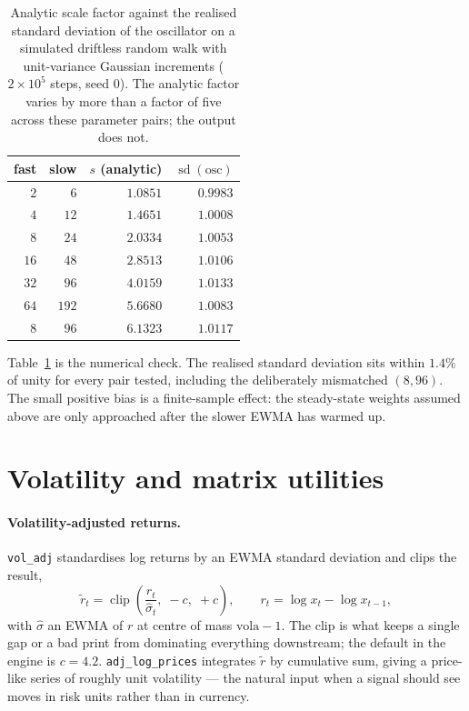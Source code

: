 \documentclass[11pt,a4paper]{article}
\newcommand{\code}[1]{\texttt{#1}}
\begin{document}
\begin{table}[t]
\centering
\caption{Analytic scale factor against the realised standard deviation of the
oscillator on a simulated driftless random walk with unit-variance Gaussian
increments ($2 \times 10^5$ steps, seed $0$). The analytic factor varies by more
than a factor of five across these parameter pairs; the output does not.}
\label{tab:osc}
\begin{tabular}{rrrr}
\toprule
fast & slow & $s$ (analytic) & $\operatorname{sd}(\mathrm{osc})$ \\
\midrule
$2$  & $6$   & $1.0851$ & $0.9983$ \\
$4$  & $12$  & $1.4651$ & $1.0008$ \\
$8$  & $24$  & $2.0334$ & $1.0053$ \\
$16$ & $48$  & $2.8513$ & $1.0106$ \\
$32$ & $96$  & $4.0159$ & $1.0133$ \\
$64$ & $192$ & $5.6680$ & $1.0083$ \\
$8$  & $96$  & $6.1323$ & $1.0117$ \\
\bottomrule
\end{tabular}
\end{table}

Table~\ref{tab:osc} is the numerical check. The realised standard deviation sits
within $1.4\%$ of unity for every pair tested, including the deliberately
mismatched $(8, 96)$. The small positive bias is a finite-sample effect: the
steady-state weights assumed above are only approached after the slower EWMA has
warmed up.

\section{Volatility and matrix utilities}

\paragraph{Volatility-adjusted returns.}
\code{vol\_adj} standardises log returns by an EWMA standard deviation and clips
the result,
\begin{equation}
  \tilde{r}_t = \operatorname{clip}\!\left( \frac{r_t}{\hat{\sigma}_t},\; -c,\; +c \right),
  \qquad r_t = \log x_t - \log x_{t-1},
\end{equation}
with $\hat\sigma$ an EWMA of $r$ at centre of mass $\mathrm{vola}-1$. The clip
is what keeps a single gap or a bad print from dominating everything downstream;
the default in the engine is $c = 4.2$. \code{adj\_log\_prices} integrates
$\tilde{r}$ by cumulative sum, giving a price-like series of roughly unit
volatility --- the natural input when a signal should see moves in risk units
rather than in currency.
\end{document}
